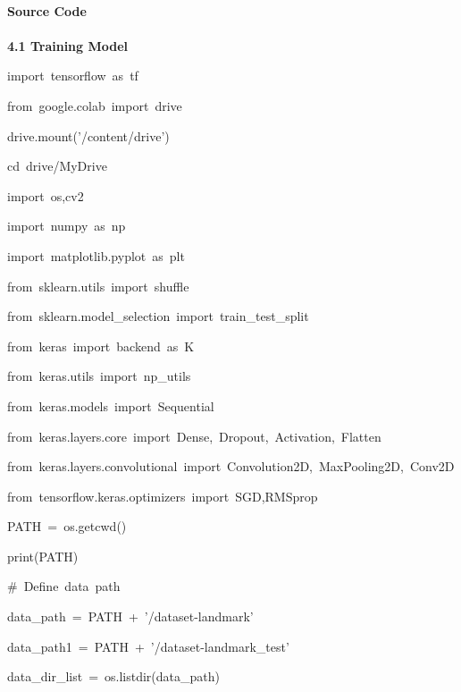 \documentclass[10pt]{article} %
\begin{document}
\paragraph{}
\noindent \begin{center} \textbf{\large Source Code} \end{center}

\noindent 
\paragraph{}
\begin{spacing}{1.5}
\noindent \textbf{4.1 Training Model}

\vspace{3mm}

\noindent import~tensorflow~as~tf

\noindent from~google.colab~import~drive

\noindent drive.mount('/content/drive')

\noindent cd~drive/MyDrive

\noindent 

\noindent import~os,cv2

\noindent import~numpy~as~np

\noindent import~matplotlib.pyplot~as~plt

\noindent 

\noindent from~sklearn.utils~import~shuffle

\noindent from~sklearn.model\_selection~import~train\_test\_split

\noindent from~keras~import~backend~as~K

\noindent from~keras.utils~import~np\_utils

\noindent from~keras.models~import~Sequential

\noindent from~keras.layers.core~import~Dense,~Dropout,~Activation,~Flatten

\noindent from~keras.layers.convolutional~import~Convolution2D,~MaxPooling2D,~Conv2D

\noindent from~tensorflow.keras.optimizers~import~SGD,RMSprop

\noindent PATH~=~os.getcwd()

\noindent print(PATH)

\noindent \#~Define~data~path

\noindent data\_path~=~PATH~+~'/dataset-landmark'

\noindent data\_path1~=~PATH~+~'/dataset-landmark\_test'

\noindent data\_dir\_list~=~os.listdir(data\_path)


\end{spacing}
\end{document}
